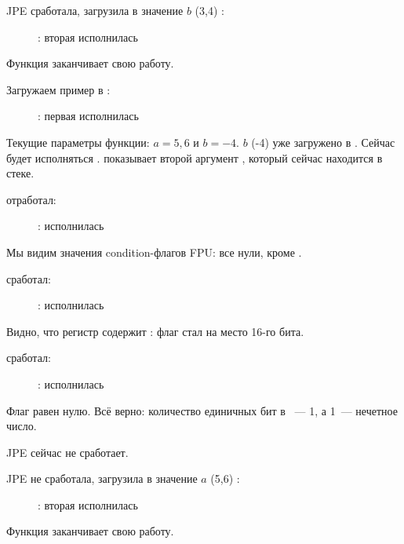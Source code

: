 \clearpage
\ac{JPE} сработала, \FLD загрузила в  значение $b$ (3,4)%
:

\begin{figure}[H]
\centering
{}
\caption{\olly: вторая \FLD исполнилась}
\label{fig:FPU_comparison_case1_olly5}
\end{figure}

Функция заканчивает свою работу.

\clearpage
{}

Загружаем пример в \olly:

\begin{figure}[H]
\centering
{}
\caption{\olly: первая \FLD исполнилась}
\label{fig:FPU_comparison_case2_olly1}
\end{figure}

Текущие параметры функции: $a=5,6$ и $b=-4$.
$b$ (-4) уже загружено в .
Сейчас будет исполняться \FCOMP. 
\olly показывает второй аргумент \FCOMP, который сейчас находится в стеке.


\clearpage
\FCOMP отработал:

\begin{figure}[H]
\centering
{}
\caption{\olly: \FCOMP исполнилась}
\label{fig:FPU_comparison_case2_olly2}
\end{figure}

Мы видим значения condition-флагов \ac{FPU}: все нули, кроме \Czero.


\clearpage
\FNSTSW сработал:

\begin{figure}[H]
\centering
{}
\caption{\olly: \FNSTSW исполнилась}
\label{fig:FPU_comparison_case2_olly3}
\end{figure}

Видно, что регистр  содержит : флаг \Czero стал на место 16-го бита.


\clearpage
\TEST сработал:

\begin{figure}[H]
\centering
{}
\caption{\olly: \TEST исполнилась}
\label{fig:FPU_comparison_case2_olly4}
\end{figure}

Флаг  равен нулю.
Всё верно: 
количество единичных бит в ~--- 1, а 1~--- нечетное число.

\ac{JPE} сейчас не сработает.

\clearpage
\ac{JPE} не сработала,  \FLD 
загрузила в  значение $a$ (5,6)%
:

\begin{figure}[H]
\centering
{}
\caption{\olly: вторая \FLD исполнилась}
\label{fig:FPU_comparison_case2_olly5}
\end{figure}

Функция заканчивает свою работу.
